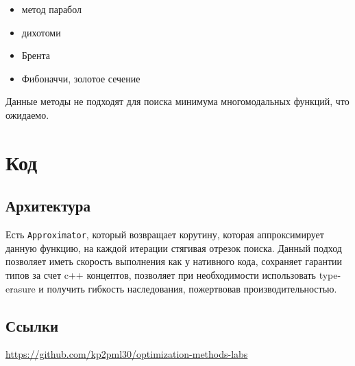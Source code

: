 \documentclass[russian, english]{article}
\def\code#1{\texttt{#1}}
\begin{document}
\begin{itemize}
	\item[\raisebox{.5pt}{\textcircled{\raisebox{-.9pt} {1}}}] метод парабол
	\item[\raisebox{.5pt}{\textcircled{\raisebox{-.9pt} {2}}}] дихотоми
	\item[\raisebox{.5pt}{\textcircled{\raisebox{-.9pt} {4}}}] Брента
	\item[\raisebox{.5pt}{\textcircled{\raisebox{-.9pt} {5}}}] Фибоначчи, золотое сечение
\end{itemize}
\par
Данные методы не подходят для поиска минимума многомодальных функций, что ожидаемо.

\newpage
\appendix
\section{Код}
\subsection{Архитектура}
Есть \code{Approximator}, который возвращает корутину, которая аппроксимирует данную функцию, на каждой итерации стягивая отрезок поиска. Данный подход позволяет иметь скорость выполнения как у нативного кода, сохраняет гарантии типов за счет c++ концептов, позволяет при необходимости использовать type-erasure и получить гибкость наследования, пожертвовав производительностью.

\subsection{Ссылки}
\url{https://github.com/kp2pml30/optimization-methods-labs}
\end{document}
